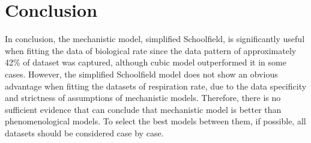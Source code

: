 \documentclass[11pt]{article}
\begin{document}
\section{Conclusion}

In conclusion, the mechanistic model, simplified Schoolfield, is significantly useful when fitting the data of biological rate since the data pattern of approximately 42\% of dataset was captured, although cubic model outperformed it in some cases. However, the simplified Schoolfield model does not show an obvious advantage when fitting the datasets of respiration rate, due to the data specificity and strictness of assumptions of mechanistic models. Therefore, there is no sufficient evidence that can conclude that mechanistic model is better than phenomenological models. To select the best models between them, if possible, all datasets should be considered case by case.





\end{document}
